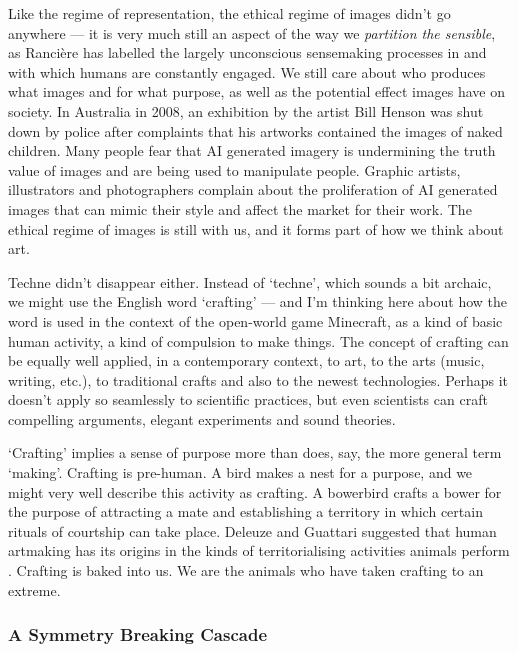 \documentclass[letterpaper]{article}
\begin{document}
    Like the regime of representation, the ethical regime of images didn't go anywhere — it is very much still an aspect of the way we \emph{partition the sensible}, as Rancière has labelled the largely unconscious sensemaking processes in and with which humans are constantly engaged. We still care about who produces what images and for what purpose, as well as the potential effect images have on society. In Australia in 2008, an exhibition by the artist Bill Henson was shut down by police after complaints that his artworks contained the images of naked children. Many people fear that AI generated imagery is undermining the truth value of images and are being used to manipulate people. Graphic artists, illustrators and photographers complain about the proliferation of AI generated images that can mimic their style and affect the market for their work. The ethical regime of images is still with us, and it forms part of how we think about art. 

    Techne didn't disappear either. Instead of ‘techne’, which sounds a bit archaic, we might use the English word ‘crafting’ — and I'm thinking here about how the word is used in the context of the open-world game Minecraft, as a kind of basic human activity, a kind of compulsion to make things. The concept of crafting can be equally well applied, in a contemporary context, to art, to the arts (music, writing, etc.), to traditional crafts and also to the newest technologies. Perhaps it doesn't apply so seamlessly to scientific practices, but even scientists can craft compelling arguments, elegant experiments and sound theories.

    ‘Crafting’ implies a sense of purpose more than does, say, the more general term ‘making’. Crafting is pre-human. A bird makes a nest for a purpose, and we might very well describe this activity as crafting. A bowerbird crafts a bower for the purpose of attracting a mate and establishing a territory in which certain rituals of courtship can take place. Deleuze and Guattari suggested that human artmaking has its origins in the kinds of territorialising activities animals perform \citep[p.15]{GuattariChsmss1995}. Crafting is baked into us. We are the animals who have taken crafting to an extreme.
    
    \subsubsection{A Symmetry Breaking Cascade}
\end{document}
